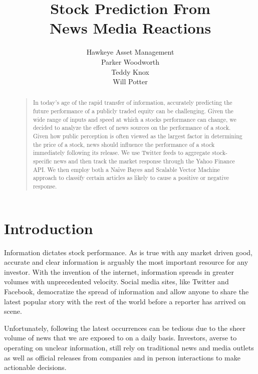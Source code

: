 \documentclass[letterpaper]{article}
\begin{document}
\title{Stock Prediction From\\ News Media Reactions}
\author{Hawkeye Asset Management\\
Parker Woodworth\\
Teddy Knox\\
Will Potter\\
}
\maketitle
\begin{abstract}
\begin{quote}
In today's age of the rapid transfer of information, accurately predicting the future performance of a publicly traded equity can be challenging. Given the wide range of inputs and speed at which a stocks performance can change, we decided to analyze the effect of news sources on the performance of a stock. Given how public perception is often viewed as the largest factor in determining the price of a stock, news should influence the performance of a stock immediately following its release. We use Twitter feeds to aggregate stock-specific news and then track the market response through the Yahoo Finance API. We then employ both a Naïve Bayes and Scalable Vector Machine approach to classify certain articles as likely to cause a positive or negative response.
\end{quote}
\end{abstract}

\section{Introduction}
\noindent Information dictates stock performance. As is true with any market driven good, accurate and clear information is arguably the most important resource for any investor. With the invention of the internet, information spreads in greater volumes with unprecedented velocity. Social media sites, like Twitter and Facebook, democratize the spread of information and allow anyone to share the latest popular story with the rest of the world before a reporter has arrived on scene. 

Unfortunately, following the latest occurrences can be tedious due to the sheer volume of news that we are exposed to on a daily basis. Investors, averse to operating on unclear information, still rely on traditional news and media outlets as well as official releases from companies and in person interactions to make actionable decisions.
\end{document}
